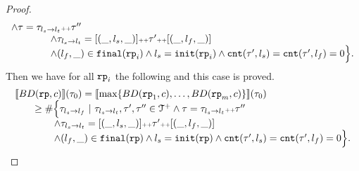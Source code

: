 \begin{proof}
\[\begin{array}{l}
    \land \mathtt{\tau} = \mathtt{\tau}_{l_s \to l_t} {\scriptscriptstyle ++} \mathtt{\tau}''
    \\ \qquad \qquad
    \land \mathtt{\tau}_{l_s \to l_t} = [(\_, l_s, \_)] {\scriptscriptstyle ++} \mathtt{\tau}' {\scriptscriptstyle ++} [(\_, l_f, \_)]
    \\ \qquad \qquad
    \land (l_{f}, \_) \in \mathtt{final}(\mathtt{rp}_i)
    \land l_s = \mathtt{init}(\mathtt{rp}_i)
    \land \mathtt{cnt}(\mathtt{\tau}', l_s) = \mathtt{cnt}(\mathtt{\tau}', l_f) = 0 
    \Big\}.
      \end{array}
\]
Then we have for all $\mathtt{rp}_i$ the following and this case is proved.
\[
  \begin{array}{l}
    \econfig{BD(\rprog, c)}(\trace_0) = 
    \econfig{ \max\left\{ BD(\rprog_1, c), \ldots, BD(\rprog_m, c) \right\}}(\trace_0)
    \\ \qquad 
    \geq
    \# \Big\{\trace_{l_s \to l_f} ~\vert~ \trace_{l_s \to l_t}, \trace', \trace''\in \ftdom
    \land \trace = \trace_{l_s \to l_t} \tracecat \trace''
    \\ \qquad \qquad
    \land \trace_{l_s \to l_t} = [(\_, l_s, \_)] \tracecat \trace' \tracecat [(\_, l_f, \_)]
    \\ \qquad \qquad
    \land (l_{f}, \_) \in \absfinal(\rprog)
    \land l_s = \absinit(\rprog)
    \land \counter(\trace', l_s) = \counter(\trace', l_f) = 0 
    \Big\}.
      \end{array}
\]


\end{proof}
